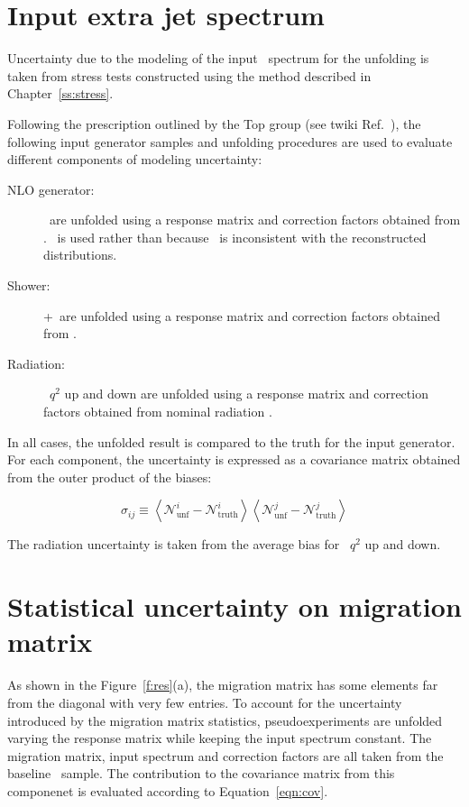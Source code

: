 \section{Input extra jet spectrum}
\label{ss:unfsystt}
Uncertainty due to the modeling of the input \ttbar\ spectrum for the unfolding is taken from stress tests constructed using the method described in Chapter~\ref{ss:stress}.

Following the prescription outlined by the Top group (see twiki Ref.~\cite{topsys}), the following input generator samples and unfolding procedures are used to evaluate different components of modeling uncertainty:
\begin{description}
\item[NLO generator:] \madpy\ are unfolded using a response matrix and correction factors obtained from \powpy. \madpy\ is used rather than \mcnlohw because \mcnlohw\ is inconsistent with the reconstructed distributions.
\item[Shower:] \pow+\hw\ are unfolded using a response matrix and correction factors obtained from \powpy.
\item[Radiation:] \madpy\ $q^{2}$ up and down are unfolded using a response matrix and correction factors obtained from nominal radiation \madpy.
\end{description}
In all cases, the unfolded result is compared to the truth for the input generator. 
For each component, the uncertainty is expressed as a covariance matrix obtained from the outer product of the biases:

\begin{equation}
\sigma_{ij} \equiv \left \langle {\mathscr N}^{i}_{\textrm{unf}}-{\mathscr N}^{i}_{\textrm{truth}} \right \rangle \left \langle {\mathscr N}^{j}_{\textrm{unf}}-{\mathscr N}^{j}_{\textrm{truth}} \right \rangle
\end{equation}

The radiation uncertainty is taken from the average bias for \madpy\ $q^{2}$ up and down.

\section{Statistical uncertainty on migration matrix}
\label{ss:mcstats}
As shown in the Figure~\ref{f:res}(a), the migration matrix has some elements far from the diagonal with very few entries. To account for the uncertainty introduced by the migration matrix statistics, pseudoexperiments are unfolded varying the response matrix while keeping the input spectrum constant. The migration matrix, input spectrum and correction factors are all taken from the baseline \powpy\ sample. The contribution to the covariance matrix from this componenet is evaluated according to Equation~\ref{eqn:cov}.

